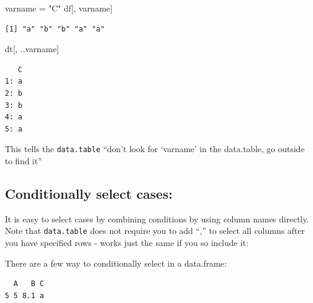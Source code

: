 \documentclass[
]{book}
\newenvironment{Shaded}{\begin{snugshade}}{\end{snugshade}}
\newcommand{\FunctionTok}[1]{\textcolor[rgb]{0.00,0.00,0.00}{#1}}
\newcommand{\NormalTok}[1]{#1}
\newcommand{\OtherTok}[1]{\textcolor[rgb]{0.56,0.35,0.01}{#1}}
\newcommand{\SpecialCharTok}[1]{\textcolor[rgb]{0.00,0.00,0.00}{#1}}
\newcommand{\StringTok}[1]{\textcolor[rgb]{0.31,0.60,0.02}{#1}}
\begin{document}
\begin{Shaded}
\begin{Highlighting}[]
\NormalTok{varname }\OtherTok{=} \StringTok{"C"}
\NormalTok{df[, varname]}
\end{Highlighting}
\end{Shaded}

\begin{verbatim}
[1] "a" "b" "b" "a" "a"
\end{verbatim}

\begin{Shaded}
\begin{Highlighting}[]
\NormalTok{dt[, ..varname]}
\end{Highlighting}
\end{Shaded}

\begin{verbatim}
   C
1: a
2: b
3: b
4: a
5: a
\end{verbatim}

This tells the \texttt{data.table} ``don't look for `varname' in the data.table, go outside to find it''

\hypertarget{conditionally-select-cases}{%
\subsection{Conditionally select cases:}\label{conditionally-select-cases}}

It is easy to select cases by combining conditions by using column names directly. Note that \texttt{data.table} does not require you to add ``,'' to select all columns after you have specified rows - works just the same if you so include it:

There are a few way to conditionally select in a data.frame:

\begin{Shaded}
\end{Shaded}

\begin{verbatim}
  A   B C
5 5 8.1 a
\end{verbatim}
\end{document}
